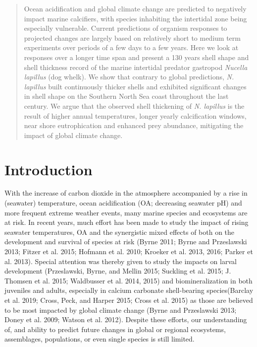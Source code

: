 \documentclass[smallextended]{svjour3}       %
\begin{document}
\begin{abstract}
Ocean acidification and global climate change are predicted to
negatively impact marine calcifiers, with species inhabiting the
intertidal zone being especially vulnerable. Current predictions of
organism responses to projected changes are largely based on relatively
short to medium term experiments over periods of a few days to a few
years. Here we look at responses over a longer time span and present a
130 years shell shape and shell thickness record of the marine
intertidal predator gastropod \emph{Nucella lapillus} (dog whelk). We
show that contrary to global predictions, \emph{N. lapillus} built
continuously thicker shells and exhibited significant changes in shell
shape on the Southern North Sea coast throughout the last century. We
argue that the observed shell thickening of \emph{N. lapillus} is the
result of higher annual temperatures, longer yearly calcification
windows, near shore eutrophication and enhanced prey abundance,
mitigating the impact of global climate change.
\\


\end{abstract}


\def\spacingset#1{\renewcommand{\baselinestretch}%
{#1}\small\normalsize} \spacingset{1}


\doublespacing

\hypertarget{intro}{%
\section{Introduction}\label{intro}}

With the increase of carbon dioxide in the atmosphere accompanied by a
rise in (seawater) temperature, ocean acidification (OA; decreasing
seawater pH) and more frequent extreme weather events, many marine
species and ecosystems are at risk. In recent years, much effort has
been made to study the impact of rising seawater temperatures, OA and
the synergistic mixed effects of both on the development and survival of
species at risk (Byrne 2011; Byrne and Przeslawski 2013; Fitzer et al.
2015; Hofmann et al. 2010; Kroeker et al. 2013, 2016; Parker et al.
2013). Special attention was thereby given to study the impacts on
larval development (Przeslawski, Byrne, and Mellin 2015; Suckling et al.
2015; J. Thomsen et al. 2015; Waldbusser et al. 2014, 2015) and
biomineralization in both juveniles and adults, especially in calcium
carbonate shell-bearing species(Barclay et al. 2019; Cross, Peck, and
Harper 2015; Cross et al. 2015) as those are believed to be most
impacted by global climate change (Byrne and Przeslawski 2013; Doney et
al. 2009; Watson et al. 2012). Despite these efforts, our understanding
of, and ability to predict future changes in global or regional
ecosystems, assemblages, populations, or even single species is still
limited.
\end{document}
